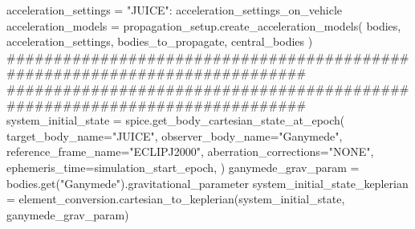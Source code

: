 {}acceleration_settings = {"JUICE": acceleration_settings_on_vehicle}\markdownRendererInterblockSeparator
{}
\markdownRendererSectionEnd \markdownRendererSectionBegin
{}\markdownRendererInterblockSeparator
{}acceleration_models = propagation_setup.create_acceleration_models( bodies, acceleration_settings, bodies_to_propagate, central_bodies )\markdownRendererInterblockSeparator
{}###########################################################################\markdownRendererInterblockSeparator
{}
\markdownRendererSectionEnd \markdownRendererSectionBegin
{}\markdownRendererInterblockSeparator
{}###########################################################################\markdownRendererInterblockSeparator
{}
\markdownRendererSectionEnd \markdownRendererSectionBegin
{}\markdownRendererInterblockSeparator
{}system_initial_state = spice.get_body_cartesian_state_at_epoch( target_body_name="JUICE", observer_body_name="Ganymede", reference_frame_name="ECLIPJ2000", aberration_corrections="NONE", ephemeris_time=simulation_start_epoch, )\markdownRendererInterblockSeparator
{}
\markdownRendererSectionEnd \markdownRendererSectionBegin
{}\markdownRendererInterblockSeparator
{}ganymede_grav_param = bodies.get("Ganymede").gravitational_parameter\markdownRendererInterblockSeparator
{}
\markdownRendererSectionEnd \markdownRendererSectionBegin
{}\markdownRendererInterblockSeparator
{}
\markdownRendererSectionEnd \markdownRendererSectionBegin
{}\markdownRendererInterblockSeparator
{}system_initial_state_keplerian = element_conversion.cartesian_to_keplerian(system_initial_state, ganymede_grav_param)\markdownRendererInterblockSeparator
{}
\markdownRendererSectionEnd \markdownRendererSectionBegin
{}\markdownRendererInterblockSeparator
{}
\markdownRendererSectionEnd \markdownRendererSectionBegin
{}\markdownRendererInterblockSeparator
